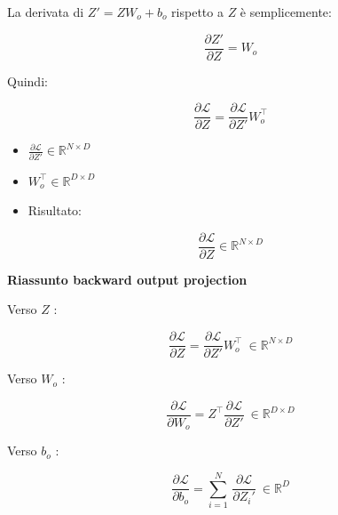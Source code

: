 \documentclass[
  11pt,
]{article}
\begin{document}
La derivata di \(Z' = ZW_{o} + b_{o}\) rispetto a \(Z\) è semplicemente:

\[\frac{\partial Z'}{\partial Z} = W_{o}\]

Quindi:

\[\frac{\partial\mathcal{L}}{\partial Z} = \frac{\partial\mathcal{L}}{\partial Z'}W_{o}^{\top}\]


\begin{itemize}
\item
  \(\frac{\partial\mathcal{L}}{\partial Z'} \in \mathbb{R}^{N \times D}\)
\item
  \(W_{o}^{\top} \in \mathbb{R}^{D \times D}\)
\item
  Risultato:
\end{itemize}


\[\frac{\partial\mathcal{L}}{\partial Z} \in \mathbb{R}^{N \times D}\]

\textbf{Riassunto backward output projection}


Verso \(Z\) :


\[\frac{\partial\mathcal{L}}{\partial Z} = \frac{\partial\mathcal{L}}{\partial Z'}W_{o}^{\top}\  \in \mathbb{R}^{N \times D}\]


Verso \(W_{o}\) :


\[\frac{\partial\mathcal{L}}{\partial W_{o}} = Z^{\top}\frac{\partial\mathcal{L}}{\partial Z'}\  \in \mathbb{R}^{D \times D}\]


Verso \(b_{o}\) :


\[\frac{\partial\mathcal{L}}{\partial b_{o}} = \sum_{i = 1}^{N}\,\frac{\partial\mathcal{L}}{\partial Z_{i}'}\  \in \mathbb{R}^{D}\]
\end{document}
